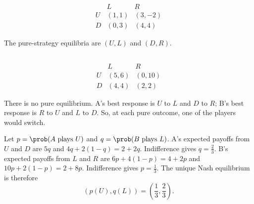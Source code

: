 \documentclass[newpages]{assignment}
\begin{document}
\subsection{}

\[
    \begin{array}{c|cc}
          & L      & R       \\
        \hline
        U & (1, 1) & (3, -2) \\
        D & (0, 3) & (4, 4)
    \end{array}
\]

\begin{solution}
    The pure-strategy equilibria are \((U,L)\) and \((D,R)\).
\end{solution}

\subsection{}

\[
    \begin{array}{c|cc}
          & L      & R       \\
        \hline
        U & (5, 6) & (0, 10) \\
        D & (4, 4) & (2, 2)
    \end{array}
\]

\begin{solution}
    There is no pure equilibrium. A's best response is \(U\) to \(L\) and
    \(D\) to \(R\); B's best response is \(R\) to \(U\) and \(L\) to \(D\).
    So, at each pure outcome, one of the players would switch.

    Let \(p=\prob(A\text{ plays }U)\) and \(q=\prob(B\text{ plays }L)\). A's
    expected payoffs from \(U\) and \(D\) are \(5q\) and
    \(4q+2(1-q)=2+2q\). Indifference gives \(q=\frac{2}{3}\).
    B's expected payoffs from \(L\) and \(R\) are \(6p+4(1-p)=4+2p\)
    and \(10p+2(1-p)=2+8p\). Indifference gives \(p=\frac{1}{3}\).
    The unique Nash equilibrium is therefore
    \[
        \left(p(U),q(L)\right)=\left(\frac{1}{3},\frac{2}{3}\right).
    \]
\end{solution}

\section{}
\end{document}

